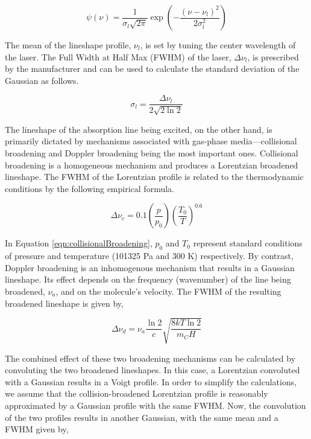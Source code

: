 \begin{equation}
  \psi(\nu) = \frac{1}{\sigma_l\sqrt{2\pi}} \exp{\left(-\dfrac{(\nu-\nu_l)^2}{2\sigma_l^2}\right)}
  \label{eqn:laserLineShape}
\end{equation}

The mean of the lineshape profile, \(\nu_l\), is set by tuning the center wavelength of the laser.
The Full Width at Half Max (FWHM) of the laser, \(\Delta\nu_l\), is prescribed by the manufacturer and can be used to calculate the standard deviation of the Gaussian as follows.

\begin{equation}
  \sigma_l = \frac{\Delta\nu_l}{2 \sqrt{ 2 \ln{2} } }
\end{equation}

The lineshape of the absorption line being excited, on the other hand, is primarily dictated by mechanisms associated with gas-phase media---collisional broadening and Doppler broadening being the most important ones.
Collisional broadening is a homogeneous mechanism and produces a Lorentzian broadened lineshape.
The FWHM of the Lorentzian profile is related to the thermodynamic conditions by the following empirical formula.

\begin{equation}
  \Delta\nu_c = 0.1 \left(\frac{p}{p_0}\right) \left(\frac{T_0}{T}\right)^{0.6}
  \label{eqn:collisionalBroadening}
\end{equation}

In Equation \ref{eqn:collisionalBroadening}, \(p_0\) and \(T_0\) represent standard conditions of pressure and temperature (101325 Pa and 300 K) respectively.
By contrast, Doppler broadening is an inhomogenous mechanism that results in a Gaussian lineshape.
Its effect depends on the frequency (wavenumber) of the line being broadened, \(\nu_a\), and on the molecule's velocity.
The FWHM of the resulting broadened lineshape is given by,

\begin{equation}
  \Delta\nu_d = \nu_a \frac{\ln 2}{c} \sqrt{\frac{8kT\ln 2}{m_CH}}
  \label{eqn:dopplerBroadening}
\end{equation}

The combined effect of these two broadening mechanisms can be calculated by convoluting the two broadened lineshapes.
In this case, a Lorentzian convoluted with a Gaussian results in a Voigt profile.
In order to simplify the calculations, we assume that the collision-broadened Lorentzian profile is reasonably approximated by a Gaussian profile with the same FWHM.
Now, the convolution of the two profiles results in another Gaussian, with the same mean and a FWHM given by,

